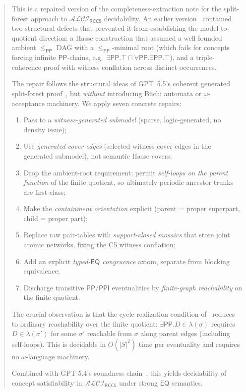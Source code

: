 \documentclass[11pt]{article}
\theoremstyle{definition}
\theoremstyle{remark}
\newcommand{\PP}{\mathsf{PP}}
\newcommand{\PPI}{\mathsf{PPI}}
\newcommand{\EQ}{\mathsf{EQ}}
\newcommand{\ALCIRCC}[1]{\mathcal{ALCI}_{\mathsf{RCC#1}}}
\begin{document}
\begin{abstract}
This is a repaired version of the completeness-extraction note for
the split-forest approach to $\ALCIRCC{5}$ decidability.  An
earlier version~\cite{CompletenessV1} contained two structural
defects that prevented it from establishing the model-to-quotient
direction: a Hasse construction that assumed a well-founded ambient
$\le_{\PP}$ DAG with a $\le_{\PP}$-minimal root (which fails for
concepts forcing infinite $\PP$-chains, e.g.\ $\exists\PP.\top
\sqcap\forall\PP.\exists\PP.\top$), and a triple-coherence proof
with witness conflation across distinct occurrences.

The repair follows the structural ideas of GPT~5.5's coherent
generated split-forest proof~\cite{GPT55Generated}, but \emph{without}
introducing B\"uchi automata or $\omega$-acceptance machinery.  We
apply seven concrete repairs:

\begin{enumerate}[label=(R\arabic*),leftmargin=2em]
\item Pass to a \emph{witness-generated submodel} (sparse,
  logic-generated, no density issue);
\item Use \emph{generated cover edges} (selected witness-cover edges
  in the generated submodel), not semantic Hasse covers;
\item Drop the ambient-root requirement; permit \emph{self-loops on
  the parent function} of the finite quotient, so ultimately
  periodic ancestor trunks are first-class;
\item Make the \emph{containment orientation} explicit (parent =
  proper superpart, child = proper part);
\item Replace raw pair-tables with \emph{support-closed mosaics} that
  store joint atomic networks, fixing the C5 witness conflation;
\item Add an explicit \emph{typed-$\EQ$ congruence} axiom, separate
  from blocking equivalence;
\item Discharge transitive $\PP/\PPI$ eventualities by
  \emph{finite-graph reachability} on the finite quotient.
\end{enumerate}

The crucial observation is that the cycle-realization condition
of~\cite{GPT55Generated} reduces to ordinary reachability over the
finite quotient: $\exists\PP.D \in \lambda(\sigma)$ requires
$D \in \lambda(\sigma')$ for some $\sigma'$ reachable from $\sigma$
along parent edges (including self-loops).  This is decidable in
$O(|S|^2)$ time per eventuality and requires no $\omega$-language
machinery.

Combined with GPT-5.4's soundness chain~\cite{SplitForest}, this
yields decidability of concept satisfiability in $\ALCIRCC{5}$
under strong $\EQ$ semantics.
\end{abstract}
\end{document}
